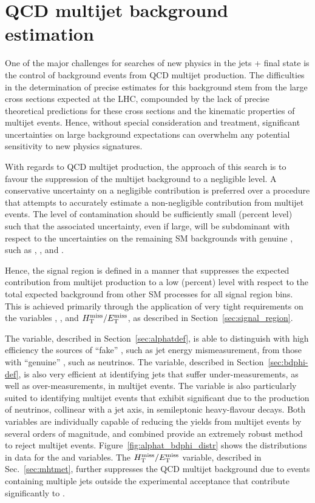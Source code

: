 \def\rmhtmet{\mbox{$\mathcal{R}$}\xspace}

\newpage
\section{QCD multijet background estimation\label{sec:qcd}}

One of the major challenges for searches of new physics in the jets +
\met final state is the control of background events from QCD multijet
production. The difficulties in the determination of precise estimates
for this background stem from the large cross sections expected at the
LHC, compounded by the lack of precise theoretical predictions for
these cross sections and the kinematic properties of multijet
events. Hence, without special consideration and treatment,
significant uncertainties on large background expectations can
overwhelm any potential sensitivity to new physics signatures.

With regards to QCD multijet production, the approach of this search
is to favour the suppression of the multijet background to a
negligible level. A conservative uncertainty on a negligible
contribution is preferred over a procedure that attempts to accurately
estimate a non-negligible contribution from multijet events. The level
of contamination should be sufficiently small (\ie percent level) such
that the associated uncertainty, even if large, will be subdominant
with respect to the uncertainties on the remaining SM backgrounds with
genuine \met, such as \wj, \ttbar, and \znunu.

Hence, the signal region is defined in a manner that suppresses the
expected contribution from multijet production to a low (\ie percent)
level with respect to the total expected background from other SM
processes for all signal region bins. This is achieved primarily
through the application of very tight requirements on the variables
\alphat, \bdphi, and $\mbox{$\mbox{$H_{\rm T}^{\rm miss}$} / \mbox{$E_\text{T}^{\rm miss}$}$}$, as described in
Section~\ref{sec:signal_region}. 

The \alphat variable, described in Section~\ref{sec:alphatdef}, is
able to distinguish with high efficiency the sources of ``fake'' \met,
such as jet energy mismeasurement, from those with ``genuine'' \met,
such as neutrinos.  The \bdphi variable, described in
Section~\ref{sec:bdphi-def}, is also very efficient at identifying
jets that suffer under-measurements, as well as over-measurements, in
multijet events. The variable is also particularly suited to
identifying multijet events that exhibit significant \met due to the
production of neutrinos, collinear with a jet axis, in semileptonic
heavy-flavour decays. Both variables are individually capable of
reducing the yields from multijet events by several orders of
magnitude, and combined provide an extremely robust method to reject
multijet events. Figure~\ref{fig:alphat_bdphi_distr} shows the
distributions in data for the \alphat and \bdphi variables. The
$\mbox{$H_{\rm T}^{\rm miss}$}/\mbox{$E_\text{T}^{\rm miss}$}$ variable, described in Sec.~\ref{sec:mhtmet}, further
suppresses the QCD multijet background due to events containing
multiple jets outside the experimental acceptance that contribute
significantly to \mht.


